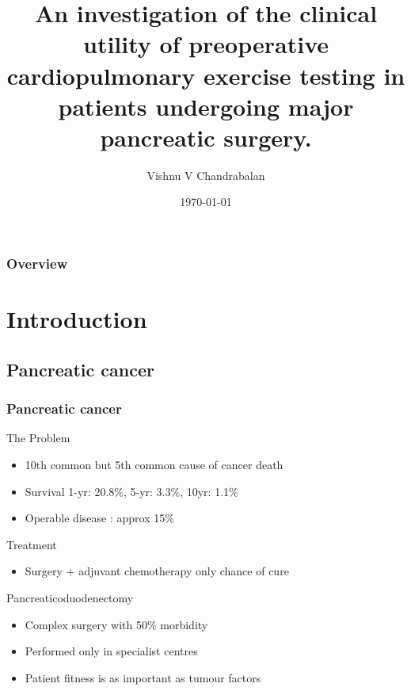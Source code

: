 \documentclass{beamer}
\title[Improving Outcomes in Pancreatic Surgery]{An investigation of the clinical utility of preoperative cardiopulmonary exercise testing in patients undergoing major pancreatic surgery.} %
\author{Vishnu V Chandrabalan} %
\institute[UoG] %
{
University of Glasgow \\ %
\medskip
}
\date{\today} %
\begin{document}
\begin{frame}
\titlepage %
\end{frame}

\begin{frame}
\frametitle{Overview} %
\tableofcontents %
\end{frame}


\section{Introduction}
\subsection{Pancreatic cancer}
\begin{frame}
	\frametitle{Pancreatic cancer} %
	\begin{block}{The Problem}
		\begin{itemize}
			\item 10th common but 5th common cause of cancer death
			\item Survival	1-yr: 20.8\%, 5-yr: 3.3\%, 10yr: 1.1\%
			\item Operable disease : approx 15\%
		\end{itemize}
	\end{block}
	\begin{block}{Treatment}
		\begin{itemize}
			\item Surgery + adjuvant chemotherapy only chance of cure
		\end{itemize}
	\end{block}
	\begin{block}{Pancreaticoduodenectomy}
		\begin{itemize}
			\item Complex surgery with 50\% morbidity
			\item Performed only in specialist centres
			\item Patient fitness is as important as tumour factors
		\end{itemize}
	\end{block}
\end{frame}
\end{document}
